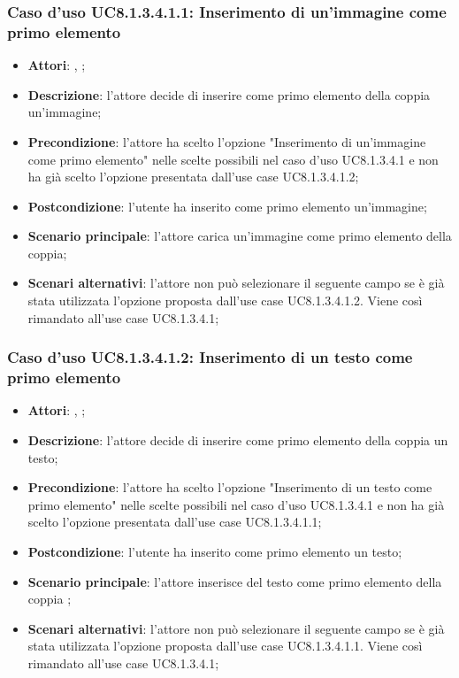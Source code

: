 		\subsubsection{Caso d'uso UC8.1.3.4.1.1: Inserimento di un'immagine come primo elemento}
		\label{UC8.1.3.4.1.1}
		\begin{itemize}
			\item \textbf{Attori}: \uau, \uaupro;
			\item \textbf{Descrizione}: l'attore decide di inserire come primo elemento della coppia un'immagine;
			\item \textbf{Precondizione}: l'attore ha scelto l'opzione "Inserimento di un'immagine come primo elemento" nelle scelte possibili nel caso d'uso UC8.1.3.4.1 e non ha già scelto l'opzione presentata dall'use case UC8.1.3.4.1.2;
			\item \textbf{Postcondizione}: l'utente ha inserito come primo elemento un'immagine;
			\item \textbf{Scenario principale}: l'attore carica un'immagine come primo elemento della coppia;  
			\item \textbf{Scenari alternativi}: l'attore non può selezionare il seguente campo se è già stata utilizzata l'opzione proposta dall'use case UC8.1.3.4.1.2. Viene così rimandato all'use case UC8.1.3.4.1;
		\end{itemize}
		
		\subsubsection{Caso d'uso UC8.1.3.4.1.2: Inserimento di un testo come primo elemento}
		\label{UC8.1.3.4.1.2}
		\begin{itemize}
			\item \textbf{Attori}: \uau, \uaupro;
			\item \textbf{Descrizione}: l'attore decide di inserire come primo elemento della coppia un testo;
			\item \textbf{Precondizione}: l'attore ha scelto l'opzione "Inserimento di un testo come primo elemento" nelle scelte possibili nel caso d'uso UC8.1.3.4.1 e non ha già scelto l'opzione presentata dall'use case UC8.1.3.4.1.1;
			\item \textbf{Postcondizione}: l'utente ha inserito come primo elemento un testo;
			\item \textbf{Scenario principale}: l'attore inserisce del testo come primo elemento della coppia ;  
			\item \textbf{Scenari alternativi}: l'attore non può selezionare il seguente campo se è già stata utilizzata l'opzione proposta dall'use case UC8.1.3.4.1.1. Viene così rimandato all'use case UC8.1.3.4.1;
		\end{itemize}
		
